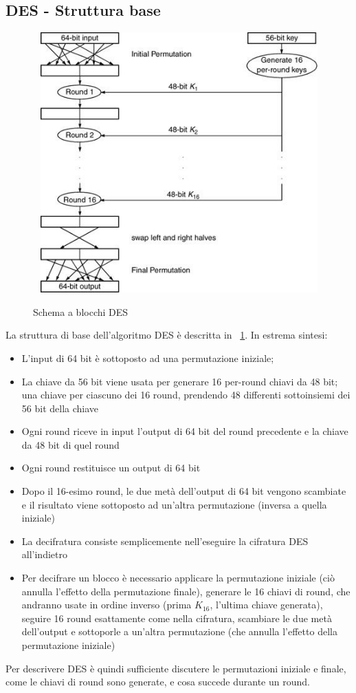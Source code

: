 \subsection{DES - Struttura base}
\begin{figure}[htbp]
	\centering%
	\subfigure%
	{\includegraphics[height=10cm, width=13cm, keepaspectratio]{Immagini/Capitolo2/des_structure.png}}
	\caption{Schema a blocchi DES \label{fig:des_struct}} 	
\end{figure}
La struttura di base dell'algoritmo DES è descritta in \figurename ~\ref{fig:des_struct}. In estrema sintesi:
\begin{itemize}
  \item L'input di 64 bit è sottoposto ad una permutazione iniziale;
  \item La chiave da 56 bit viene usata per generare 16 per-round chiavi da 48 bit; una chiave per ciascuno dei 16 round, prendendo 48 differenti sottoinsiemi dei 56 bit della chiave
  \item Ogni round riceve in input l'output di 64 bit del round precedente e la chiave da 48 bit di quel round
  \item Ogni round restituisce un output di 64 bit
  \item Dopo il 16-esimo round, le due metà dell'output di 64 bit vengono scambiate e il risultato viene sottoposto ad un’altra permutazione (inversa a quella iniziale)
  \item La decifratura consiste semplicemente nell’eseguire la cifratura DES all’indietro
  \item Per decifrare un blocco è necessario applicare la permutazione iniziale (ciò annulla l’effetto della permutazione finale), generare le 16 chiavi di round, che andranno usate in ordine inverso (prima $K_{16}$, l'ultima chiave generata), seguire 16 round esattamente come nella cifratura, scambiare le due metà dell'output e sottoporle a un'altra permutazione (che annulla l'effetto della permutazione iniziale)
\end{itemize}
Per descrivere DES è quindi sufficiente discutere le permutazioni iniziale e finale, come le chiavi di round sono generate, e cosa succede durante un round.


